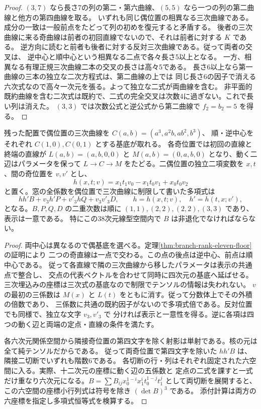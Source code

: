 \begin{proof}
$(3,7)$ なら長さ7の列の第二・第六曲線、$(5,5)$ なら一つの列の第二曲線と他方の第四曲線を取る。
いずれも同じ偶位置の相異なる三次曲線である。成分の一致は一般前点をたどって列の初めを復元すると矛盾する。
後者の三次曲線に来る奇曲線は前者の初回直線でないので、それは前者に対する $K$ である。
逆方向に読むと前者も後者に対する反対三次曲線である。従って両者の交叉は、
逆中心と順中心という相異なる二点で各々長さ5以上となる。
一方、相異なる有理正規三次曲線二本の交叉の長さは高々5である。
長さ6以上なら第一曲線の三本の独立な二次方程式は、第二曲線の上では
同じ長さ6の因子で消える六次式なので高々一次元を張る。よって独立な二式が両曲線を含む。
非平面的既約曲線を含む二次式は既約で、二式の完全交叉は次数4に過ぎない。これで長い列は消えた。
$(3,3)$ では次数公式と逆公式から第二曲線で $f_2=b_2=5$ を得る。
\end{proof}

\begin{proposition}\label{prop:branch-three-three-frame}
残った配置で偶位置の三次曲線を $C(a,b)=(a^3,a^2b,ab^2,b^3)$、
順・逆中心をそれぞれ $C(1,0),C(0,1)$ とする基底が取れる。
各奇位置では初回の直線と終端の直線が
$L(a,b)=(a,b,0,0)$ と $M(a,b)=(0,a,b,0)$ となり、動く二辺はパラメータを保って
$L\to C\to M$ をたどる。二偶位置の独立二項変数を $x,t$、間の奇位置を $v,v'$ とし、
\[
 h(x,t;v)=x_1t_1v_0-x_1t_0v_1+x_0t_0v_2
\]
と置く。窓の全係数を偶位置で三次曲線に制限して書いた多項式は
\[
 hh'B+v_3 h'P+v'_3 hQ+v_3v'_3D,\qquad
 h=h(x,t;v),\quad h'=h(t,x;v'),
\]
となる。$B,P,Q,D$ の二重次数は順に $(1,1),(2,2),(2,2),(3,3)$ であり、表示は一意である。
特にこの38次元線型空間内で $B$ は非退化でなければならない。
\end{proposition}
\begin{proof}
両中心は異なるので偶基底を選べる。定理\ref{thm:branch-rank-eleven-floor}の証明により
二つの奇直線は一点で交わる。この点の後点は逆中心、前点は順中心である。
従って各直線で隣の三次曲線から移したパラメータは表示の共通点で整合し、
交点の代表ベクトルを合わせて同時に四次元の基底へ延ばせる。
三次埋込みの座標は三次式の基底なので制限でテンソルの情報は失われない。
$v$ の最初の三係数は $M(x)$ と $L(t)$ をともに消す。従って分数体上でその外積の倍数であり、
三係数に共通の既約因子がないので多項式倍である。反対位置でも同様で、独立な文字 $v_3,v'_3$ で
分ければ表示と一意性を得る。逆に各項は四つの動く辺と両端の定点・直線の条件を満たす。

各六次元関係空間から隣接奇位置の第四文字を除く射影は単射である。核の元は全て純テンソルだからである。
従って両奇位置で第四文字を除いた $hh'B$ は、隣接二切断でいずれも階数6である。
各切断の行・列はそれぞれ固定された六空間に入る。実際、十二次元の座標に動く辺の五係数と
定点の二式を課すと一式だけ重なり六次元になる。$B=\sum B_{ij}x_0^{1-i}x_1^it_0^{1-j}t_1^j$
として両切断を展開すると、この六空間の座標小行列式は符号を除き $(\det B)^3$ である。
添付計算は両方の六座標を指定し多項式恒等式を検算する。
\end{proof}
